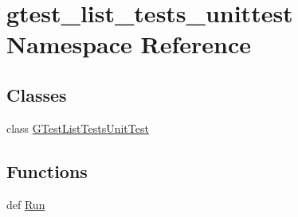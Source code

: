 \hypertarget{namespacegtest__list__tests__unittest}{\section{gtest\-\_\-list\-\_\-tests\-\_\-unittest Namespace Reference}
\label{namespacegtest__list__tests__unittest}
}
\subsection*{Classes}
\begin{DoxyCompactItemize}
\item 
class \hyperlink{classgtest__list__tests__unittest_1_1_g_test_list_tests_unit_test}{G\-Test\-List\-Tests\-Unit\-Test}
\end{DoxyCompactItemize}
\subsection*{Functions}
\begin{DoxyCompactItemize}
\item 
def \hyperlink{namespacegtest__list__tests__unittest_ab19e9fbe5019dee351750f028273c741}{Run}
\end{DoxyCompactItemize}
